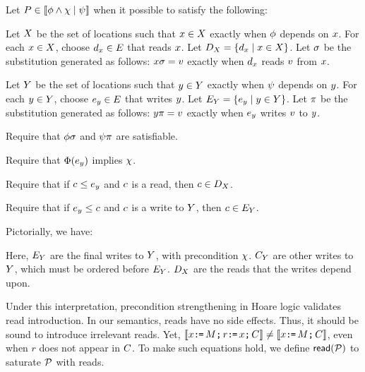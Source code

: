 \begin{definition}
  \label{def:prepost}
  Let $P\in\llbracket\phi\land\chi\mid\psi\rrbracket$
  when it possible to satisfy the following:

  Let $X$ be the set of locations such that $x\in X$ exactly
  when $\phi$ depends on $x$.  For each $x\in X$, choose
  $d_x\in E$ that reads $x$.
  Let $D_X=\{d_x\mid x\in X\}$.
  Let $\sigma$ be the substitution generated %
  as follows:
  $x\sigma = v$ exactly when $d_x$ reads $v$ from $x$.

  Let $Y$ be the set of locations such that $y\in Y$ exactly
  when $\psi$ depends on $y$.  For each $y\in Y$, choose
  $e_y\in E$ that writes $y$.
  Let $E_Y=\{e_y\mid y\in Y\}$.
  Let $\pi$ be the substitution generated %
  as follows:
  $y\pi = v$ exactly when $e_y$ writes $v$ to $y$.

  Require that $\phi\sigma$ and $\psi\pi$ are satisfiable.

  Require that $\Phi(e_y)$ implies $\chi$.
  
  Require that if $c\le e_y$ and $c$ is a read, then $c\in D_X$.

  Require that if $e_y\le c$ and $c$ is a write to $Y$, then $c\in E_Y$.
\end{definition}
Pictorially, we have:
\begin{tikzdisplay}[node distance=.1ex and 2em]
\end{tikzdisplay}
Here, $E_Y$ are the final writes to $Y$, with precondition $\chi$.
$C_Y$ are other writes to $Y$, which must be ordered before $E_Y$.
$D_X$ are the reads that the writes depend upon.

Under this interpretation, precondition strengthening in Hoare logic
validates read introduction.  In our semantics, reads have no side effects.
Thus, it should be sound to introduce irrelevant reads.  Yet,
$\llbracket x\texttt{:}\mkern-1mu\texttt{=}\,M\texttt{;}\,\allowbreak r\texttt{:}\mkern-1mu\texttt{=}\, x\texttt{;}\,\allowbreak C\rrbracket\neq \llbracket x\texttt{:}\mkern-1mu\texttt{=}\,M\texttt{;}\,\allowbreak C\rrbracket$, even when $r$ does not appear in
$C$.  To make such equations hold, we define ${\mathsf{read}}(\mathcal{P})$ to saturate
$\mathcal{P}$ with reads.

